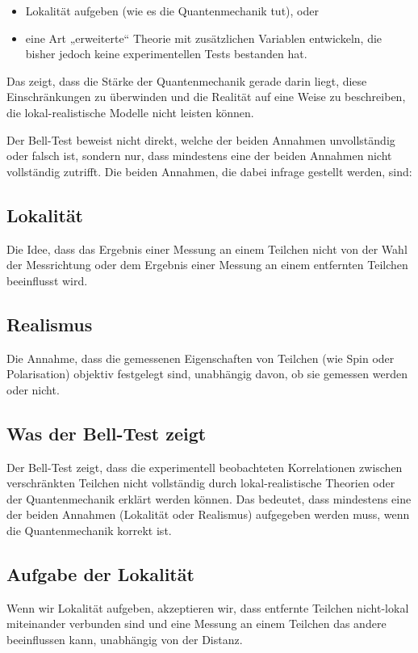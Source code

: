 \documentclass[12pt,a4paper]{article}
\begin{document}
	\begin{itemize}
		\item Lokalität aufgeben (wie es die Quantenmechanik tut), oder
		\item eine Art „erweiterte“ Theorie mit zusätzlichen Variablen entwickeln, die bisher jedoch keine experimentellen Tests bestanden hat.
	\end{itemize}
	
	Das zeigt, dass die Stärke der Quantenmechanik gerade darin liegt, diese Einschränkungen zu überwinden und die Realität auf eine Weise zu beschreiben, die lokal-realistische Modelle nicht leisten können.
	
	
	
	
	Der Bell-Test beweist nicht direkt, welche der beiden Annahmen unvollständig oder falsch ist, sondern nur, dass mindestens eine der beiden Annahmen nicht vollständig zutrifft. Die beiden Annahmen, die dabei infrage gestellt werden, sind:
	
	\subsection{Lokalität}
	Die Idee, dass das Ergebnis einer Messung an einem Teilchen nicht von der Wahl der Messrichtung oder dem Ergebnis einer Messung an einem entfernten Teilchen beeinflusst wird.
	
	\subsection{Realismus}
	Die Annahme, dass die gemessenen Eigenschaften von Teilchen (wie Spin oder Polarisation) objektiv festgelegt sind, unabhängig davon, ob sie gemessen werden oder nicht.
	
	\subsection{Was der Bell-Test zeigt}
	Der Bell-Test zeigt, dass die experimentell beobachteten Korrelationen zwischen verschränkten Teilchen nicht vollständig durch lokal-realistische Theorien oder der Quantenmechanik erklärt werden können. Das bedeutet, dass mindestens eine der beiden Annahmen (Lokalität oder Realismus) aufgegeben werden muss, wenn die Quantenmechanik korrekt ist.
	
	\subsection{Aufgabe der Lokalität}
	Wenn wir Lokalität aufgeben, akzeptieren wir, dass entfernte Teilchen nicht-lokal miteinander verbunden sind und eine Messung an einem Teilchen das andere beeinflussen kann, unabhängig von der Distanz.
	
\end{document}
